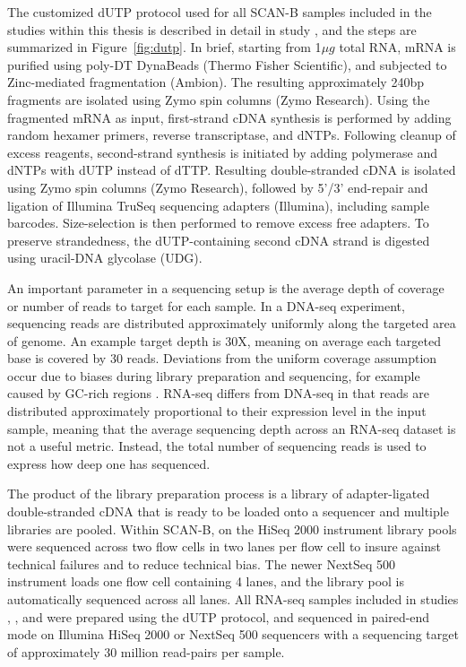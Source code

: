 \documentclass[11pt]{book}
\newcommand{\scanb}{\mbox{SCAN-B}}
\begin{document}
The customized dUTP protocol used for all \scanb{} samples included in the studies within this thesis is described in detail in study \I, and the steps are summarized in Figure~\ref{fig:dutp}. In brief, starting from 1$\mu{g}$ total RNA, mRNA is purified using poly-DT DynaBeads (Thermo Fisher Scientific), and subjected to Zinc-mediated fragmentation (Ambion). The resulting approximately 240bp fragments are isolated using Zymo spin columns (Zymo Research). Using the fragmented mRNA as input, first-strand cDNA synthesis is performed by adding random hexamer primers, reverse transcriptase, and dNTPs. Following cleanup of excess reagents, second-strand synthesis is initiated by adding polymerase and dNTPs with dUTP instead of dTTP. Resulting double-stranded cDNA is isolated using Zymo spin columns (Zymo Research), followed by 5'/3' end-repair and ligation of Illumina TruSeq sequencing adapters (Illumina), including sample barcodes. Size-selection is then performed to remove excess free adapters. To preserve strandedness, the dUTP-containing second cDNA strand is digested using uracil-DNA glycolase (UDG).

An important parameter in a sequencing setup is the average depth of coverage or number of reads to target for each sample. In a DNA-seq experiment, sequencing reads are distributed approximately uniformly along the targeted area of genome. An example target depth is 30X, meaning on average each targeted base is covered by 30 reads. Deviations from the uniform coverage assumption occur due to biases during library preparation and sequencing, for example caused by GC-rich regions \cite{Benjamini:2012, Ross:2013}. RNA-seq differs from DNA-seq in that reads are distributed approximately proportional to their expression level in the input sample, meaning that the average sequencing depth across an RNA-seq dataset is not a useful metric. Instead, the total number of sequencing reads is used to express how deep one has sequenced.

The product of the library preparation process is a library of adapter-ligated double-stranded cDNA that is ready to be loaded onto a sequencer and multiple libraries are pooled. Within \scanb{}, on the HiSeq 2000 instrument library pools were sequenced across two flow cells in two lanes per flow cell to insure against technical failures and to reduce technical bias. The newer NextSeq 500 instrument loads one flow cell containing 4 lanes, and the library pool is automatically sequenced across all lanes. All RNA-seq samples included in studies \I, \III, and \IV were prepared using the dUTP protocol, and sequenced in paired-end mode on Illumina HiSeq 2000 or NextSeq 500 sequencers with a sequencing target of approximately 30 million read-pairs per sample.
\end{document}
